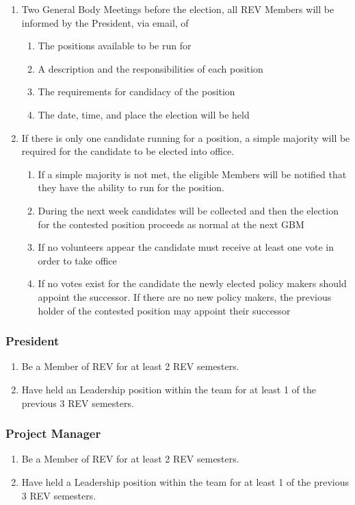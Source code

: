 \begin{enumerate}
\item Two General Body Meetings before the election, all REV Members will be informed by the President, via email, of
    \begin{enumerate}
    \item The positions available to be run for
    \item A description and the responsibilities of each position
    \item The requirements for candidacy of the position
    \item The date, time, and place the election will be held
    \end{enumerate}
\item If there is only one candidate running for a position, a simple majority will be required for the candidate to be elected into office.
    \begin{enumerate}
    \item  If a simple majority is not met, the eligible Members will be notified that they have the ability to run for the position.
    \item During the next week candidates will be collected and then the election for the contested position proceeds as normal at the next GBM
    \item If no volunteers appear the candidate must receive at least one vote in order to take office
    \item If no votes exist for the candidate the newly elected policy makers should appoint the successor. If there are no new policy makers, the previous holder of the contested position may appoint their successor
    \end{enumerate}
\end{enumerate}

\subsubsection{President}
\label{roles:qualifications:president}
\begin{enumerate}
\item Be a Member of REV for at least 2 REV semesters.
\item Have held an Leadership position within the team for at least 1 of the previous 3 REV semesters.
\end{enumerate}

\subsubsection{Project Manager}
\label{roles:qualifications:pm}
\begin{enumerate}
\item Be a Member of REV for at least 2 REV semesters.
\item Have held a Leadership position within the team for at least 1 of the previous 3 REV semesters.
\end{enumerate}

